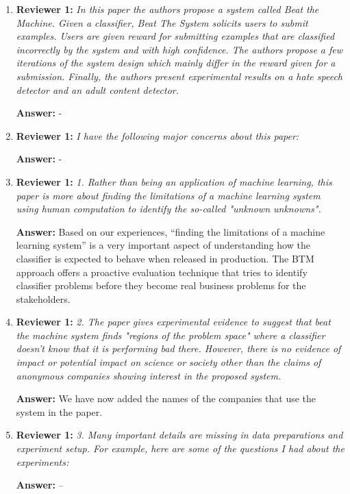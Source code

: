 \documentclass[letterpaper]{article}
\begin{document}
\begin{enumerate}

\item \textbf{Reviewer 1:} \emph{In this paper the authors propose a system called Beat the Machine. Given a classifier, Beat The System solicits users to submit examples. Users are given reward for submitting examples that are classified incorrectly by the system and with high confidence. The authors propose a few iterations of the system design which mainly differ in the reward given for a submission. Finally, the authors present experimental results on a hate speech detector and an adult content detector.}

\textbf{Answer:} -

\item \textbf{Reviewer 1:} \emph{ I have the following major concerns about this paper:}

\textbf{Answer:} -

\item \textbf{Reviewer 1:} \emph{1. Rather than being an application of machine learning, this paper is more about finding the limitations of a machine learning system using human computation to identify the so-called "unknown unknowns".}

\textbf{Answer:} Based on our experiences, ``finding the limitations of a machine learning system'' is a very important aspect of understanding how the classifier is expected to behave when released in production. The BTM approach offers a proactive evaluation technique that tries to identify classifier problems before they become real business problems for the stakeholders.


\item \textbf{Reviewer 1:} \emph{2.  The paper gives experimental evidence to suggest that beat the machine system finds "regions of the problem space" where a classifier doesn't know that it is performing bad there. However, there is no evidence of impact or potential impact on science or society other than the claims of anonymous companies showing interest in the proposed system.}

\textbf{Answer:} We have now added the names of the companies that use the system in the paper.

\item \textbf{Reviewer 1:} \emph{3. Many important details are missing in data preparations and experiment setup. For example, here are some of the questions I had about the experiments:}

\textbf{Answer:} --


\end{enumerate}
\end{document}
